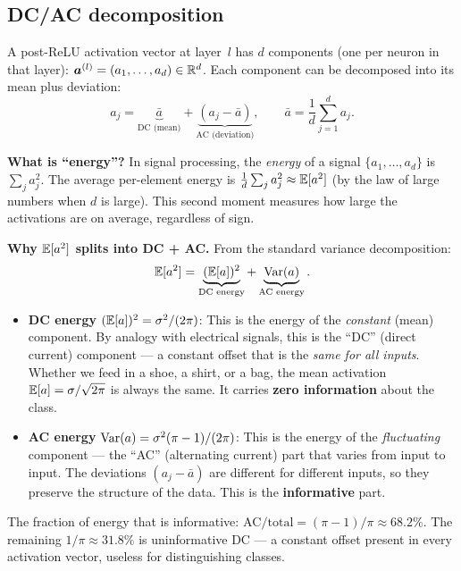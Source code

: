 \subsection{DC/AC decomposition}
\label{sec:dc_ac}

A post-ReLU activation vector at layer~$l$ has $d$ components (one per
neuron in that layer):
$\bm{a}^{(l)} = (a_1, \dots, a_d) \in \mathbb{R}^d$.
Each component can be decomposed into its mean plus deviation:
\begin{equation}\label{eq:dc_ac}
  a_j = \underbrace{\bar{a}}_{\text{DC (mean)}}
      + \underbrace{(a_j - \bar{a})}_{\text{AC (deviation)}},
  \qquad \bar{a} = \frac{1}{d}\sum_{j=1}^{d} a_j.
\end{equation}

\textbf{What is ``energy''?}
In signal processing, the \emph{energy} of a signal
$\{a_1, \dots, a_d\}$ is $\sum_j a_j^2$.  The average per-element
energy is $\frac{1}{d}\sum_j a_j^2 \approx \mathbb{E}[a^2]$
(by the law of large numbers when $d$ is large).
This second moment measures how large the activations are on average,
regardless of sign.

\textbf{Why $\mathbb{E}[a^2]$ splits into DC + AC.}
From the standard variance decomposition:
\[
  \mathbb{E}[a^2] = \underbrace{(\mathbb{E}[a])^2}_{\text{DC energy}}
           + \underbrace{\operatorname{Var}(a)}_{\text{AC energy}}.
\]
\begin{itemize}
  \item \textbf{DC energy} $(\mathbb{E}[a])^2 = \sigma^2/(2\pi)$:
        This is the energy of the \emph{constant} (mean) component.
        By analogy with electrical signals, this is the ``DC'' (direct
        current) component --- a constant offset that is the
        \emph{same for all inputs}.  Whether we feed in a shoe, a shirt,
        or a bag, the mean activation $\mathbb{E}[a] = \sigma/\sqrt{2\pi}$
        is always the same.  It carries \textbf{zero information}
        about the class.

  \item \textbf{AC energy} $\operatorname{Var}(a) = \sigma^2(\pi-1)/(2\pi)$:
        This is the energy of the \emph{fluctuating} component ---
        the ``AC'' (alternating current) part that varies from input
        to input.  The deviations $(a_j - \bar{a})$ are different for
        different inputs, so they preserve the structure of the data.
        This is the \textbf{informative} part.
\end{itemize}

\noindent
The fraction of energy that is informative:
$\text{AC}/\text{total} = (\pi-1)/\pi \approx 68.2\%$.
The remaining $1/\pi \approx 31.8\%$ is uninformative DC ---
a constant offset present in every activation vector,
useless for distinguishing classes.

